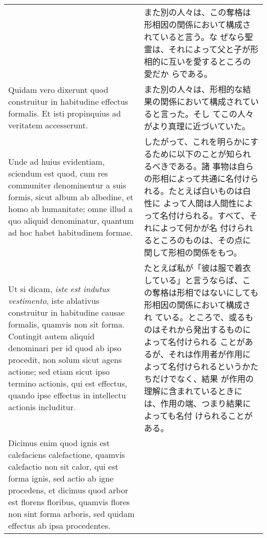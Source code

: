 \documentclass[10pt]{jsarticle} %
\begin{document}
\begin{longtable}{p{21em}p{21em}}
&

また別の人々は、この奪格は形相因の関係において構成されていると言う。な
 ぜなら聖霊は、それによって父と子が形相的に互いを愛するところの愛だか
 らである。
\\


Quidam vero dixerunt
 quod construitur in habitudine effectus formalis. Et isti propinquius
 ad veritatem accesserunt. 

&

また別の人々は、形相的な結果の関係において構成されていると言った。そし
 てこの人々がより真理に近づいていた。

\\



Unde ad huius evidentiam, sciendum est quod, cum res communiter
 denominentur a suis formis, sicut album ab albedine, et homo ab
 humanitate; omne illud a quo aliquid denominatur, quantum ad hoc
 habet habitudinem formae. 

&

したがって、これを明らかにするために以下のことが知られるべきである。諸
 事物は自らの形相によって共通に名付けられる。たとえば白いものは白性に
 よって人間は人間性によって名付けられる。すべて、それによって何かが名
 付けられるところのものは、その点に関して形相の関係をもつ。

\\


Ut si dicam, {\itshape iste est indutus vestimento},
 iste ablativus construitur in habitudine causae formalis, quamvis non
 sit forma. Contingit autem aliquid denominari per id quod ab ipso
 procedit, non solum sicut agens actione; sed etiam sicut ipso termino
 actionis, qui est effectus, quando ipse effectus in intellectu
 actionis includitur. 


&

たとえば私が「彼は服で着衣している」と言うならば、この奪格は形相ではないにしても形相因の関係において構成され
 ている。ところで、或るものはそれから発出するものによって名付けられる
 ことがあるが、それは作用者が作用によって名付けられるというかたちだけでなく、結果
 が作用の理解に含まれているときには、作用の端、つまり結果によっても名付
 けられることがある。

\\


Dicimus enim quod ignis est calefaciens
 calefactione, quamvis calefactio non sit calor, qui est forma ignis,
 sed actio ab igne procedens, et dicimus quod arbor est florens
 floribus, quamvis flores non sint forma arboris, sed quidam effectus
 ab ipsa procedentes. 



\end{longtable}
\end{document}
